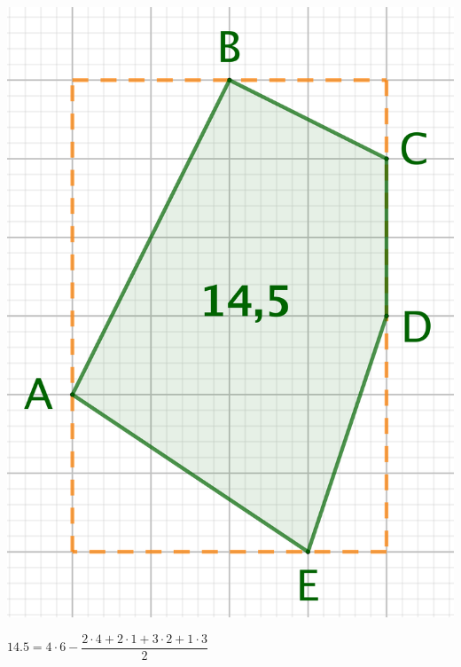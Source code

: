 \begin{multicols}{2}
	\small\itshape
    \begin{center}
        \includegraphics[scale=.4]{content/polygon/sufficient-cond/convex-1.png}
        
       	\smallskip
	
		$\num{14.5} = 4 \cdot 6 - \dfrac{2 \cdot 4 + 2 \cdot 1 + 3 \cdot 2 + 1 \cdot 3}{2}$
    \end{center}

	\columnbreak
	

\end{multicols}
